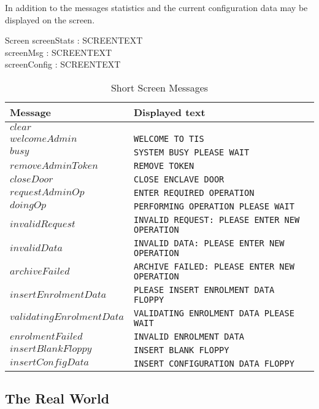 In addition to the messages statistics and the current configuration
data may be displayed on the screen.

\begin{schema}{Screen}
        screenStats : SCREENTEXT
\\      screenMsg : SCREENTEXT
\\      screenConfig : SCREENTEXT 
\end{schema}

\begin{table}[h]
\begin{tabular}{|l|l|}
{\bf Message}   &  {\bf Displayed text}   \\
\hline
$clear$                 &                               \\
$welcomeAdmin$          & {\tt WELCOME TO TIS}          \\
$busy$                  & {\tt SYSTEM BUSY PLEASE WAIT} \\ 
$removeAdminToken$      & {\tt REMOVE TOKEN} \\
$closeDoor$             & {\tt CLOSE ENCLAVE DOOR} \\
$requestAdminOp$        & {\tt ENTER REQUIRED OPERATION} \\
$doingOp$               & {\tt PERFORMING OPERATION PLEASE WAIT} \\
$invalidRequest$        & {\tt INVALID REQUEST: PLEASE ENTER NEW
OPERATION} \\
$invalidData$           & {\tt INVALID DATA: PLEASE ENTER NEW
OPERATION} \\
$archiveFailed$         & {\tt ARCHIVE FAILED: PLEASE ENTER NEW
OPERATION} \\
$insertEnrolmentData$   & {\tt PLEASE INSERT ENROLMENT DATA FLOPPY} \\
$validatingEnrolmentData$ & {\tt VALIDATING ENROLMENT DATA PLEASE WAIT
} \\
$enrolmentFailed$       & {\tt INVALID ENROLMENT DATA} \\
$insertBlankFloppy$     & {\tt INSERT BLANK FLOPPY} \\
$insertConfigData$      & {\tt INSERT CONFIGURATION DATA FLOPPY} \\
\hline
\end{tabular}
\caption{Short Screen Messages}
\label{tab:screen}
\end{table}

\subsection{The Real World}

